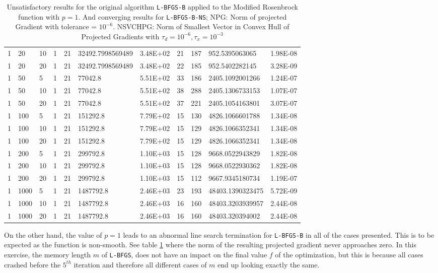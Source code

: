 \begin{table}
\begin{center}
\begin{tabular}{|l|l|l|l|l|l|l|l|l|l|l|}
     1 &  20 & 10  & 1 & 21 & 32492.7998569489 & 3.48E+02 & 21 & 187 & 952.5395063065 & 1.98E-08\\
    1 &   20 & 20  & 1 & 21 & 32492.7998569489 & 3.48E+02 & 22 & 185 & 952.5402282145 & 3.28E-09\\
    1 &   50 & 5  & 1 & 21 & 77042.8 & 5.51E+02 & 33 & 186 & 2405.1092001266 & 1.24E-07\\
    1 &   50 & 10  & 1 & 21 & 77042.8 & 5.51E+02 & 38 & 288 & 2405.1306733153 & 1.07E-07\\
     1 &  50 & 20  & 1 & 21 & 77042.8 & 5.51E+02 & 37 & 221 & 2405.1054163801 & 3.07E-07\\
    1 &   100 & 5  & 1 & 21 & 151292.8 & 7.79E+02 & 15 & 130 & 4826.1066601788 & 1.34E-08\\
     1 &  100 & 10  & 1 & 21 & 151292.8 & 7.79E+02 & 15 & 129 & 4826.1066352341 & 1.34E-08\\
     1 &  100 & 20  & 1 & 21 & 151292.8 & 7.79E+02 & 15 & 129 & 4826.1066352341 & 1.34E-08\\
     1 &  200 & 5  & 1 & 21 & 299792.8 & 1.10E+03 & 15 & 128 & 9668.0522943829 & 1.82E-08\\
     1 &  200 & 10  & 1 & 21 & 299792.8 & 1.10E+03 & 15 & 128 & 9668.0522930362 & 1.82E-08\\
     1 &  200 & 20  & 1 & 21 & 299792.8 & 1.10E+03 & 15 & 112 & 9667.9345180734 & 1.19E-07\\
     1 &  1000 & 5  & 1 & 21 & 1487792.8 & 2.46E+03 & 23 & 193 & 48403.1390323475 & 5.72E-09\\
     1 &  1000 & 10  & 1 & 21 & 1487792.8 & 2.46E+03 & 16 & 160 & 48403.3203939957 & 2.44E-08\\
     1 &  1000 & 20  & 1 & 21 & 1487792.8 & 2.46E+03 & 16 & 160 & 48403.320394002 & 2.44E-08\\
      \hline
    \end{tabular}
    \caption[Modified Rosenbrock with $p = 1$]{Unsatisfactory results for the original algorithm \texttt{L-BFGS-B} applied to the Modified Rosenbrock function with $p = 1$. And converging results for \texttt{L-BFGS-B-NS}; NPG: Norm of projected Gradient with tolerance = $10^{-6}$. NSVCHPG: Norm of Smallest Vector in Convex Hull of Projected Gradients with $\tau_d = 10^{-6}, \tau_x = 10^{-3}$}
    \label{pequal1merged}
  \end{center}
\end{table}

On the other hand, the value of $p = 1$ leads to an abnormal line search termination for \texttt{L-BFGS-B} in all of the cases presented. This is to be expected as the function is non-smooth. See table \ref{pequal1merged} where the norm of the resulting projected gradient never approaches zero. In this exercise, the memory length $m$ of \texttt{L-BFGS}, does not have an impact on the final value $f$ of the optimization, but this is because all cases crashed before the $5^{th}$ iteration and therefore all different cases of $m$ end up looking exactly the same.

